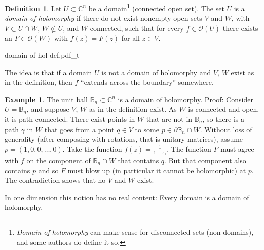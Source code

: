 \documentclass[12pt,openany]{book}
\newcommand{\C}{{\mathbb{C}}}
\newcommand{\bB}{{\mathbb{B}}}
\newcommand{\sO}{{\mathscr{O}}}
\newcommand{\myindex}[1]{#1\index{#1}}
\theoremstyle{plain}
\theoremstyle{remark}
\theoremstyle{definition}
\newtheorem{defn}[thm]{Definition}
\newenvironment{myfig}{%
    \begin{center}
}{%
    \end{center}
}
\theoremstyle{exercise}
\theoremstyle{example}
\newtheorem{example}[thm]{Example}
\begin{document}
\begin{defn} \label{defn:domainofhol}
Let $U \subset \C^n$ be a domain\footnote{\emph{Domain of
holomorphy} can make sense for disconnected sets (non-domains), and some authors
do define it so.}
(connected open set).  The set $U$ is
a \emph{\myindex{domain of holomorphy}} if there do not exist
nonempty open sets
$V$ and $W$, with $V \subset U \cap W$, $W \not\subset U$, and $W$
connected, such that for every $f \in \sO(U)$ there exists an $F \in
\sO(W)$ with $f(z) = F(z)$ for all $z \in V$.
\end{defn}

\begin{myfig}
{domain-of-hol-def.pdf_t}
\end{myfig}

The idea is that if a domain $U$
is not a domain of holomorphy and $V$, $W$ exist as in the
definition, then $f$ ``extends across the boundary'' somewhere.

\begin{example}
The unit ball $\bB_n \subset \C^n$ is a domain of holomorphy.  Proof: 
Consider $U=\bB_n$, and suppose $V$, $W$ as in the definition exist.
As $W$ is
connected and open, it is path connected.  There exist
points in $W$ that are not in $\bB_n$, so there
is a path $\gamma$ in $W$ that goes
from a point $q \in V$ to some $p \in \partial \bB_n \cap W$.
Without loss of generality (after composing with
rotations, that is unitary matrices), assume $p =
(1,0,0,\ldots,0)$.  Take the function $f(z) = \frac{1}{1-z_1}$.  
The function $F$ must agree with $f$ on the component of
$\bB_n \cap W$ that contains $q$.  But that component also contains $p$ and
so $F$ must blow up (in particular it cannot be holomorphic) at
$p$.  The contradiction shows that no $V$ and $W$ exist.
\end{example}

In one dimension this notion has no real content: Every domain is a domain
of holomorphy.
\end{document}
